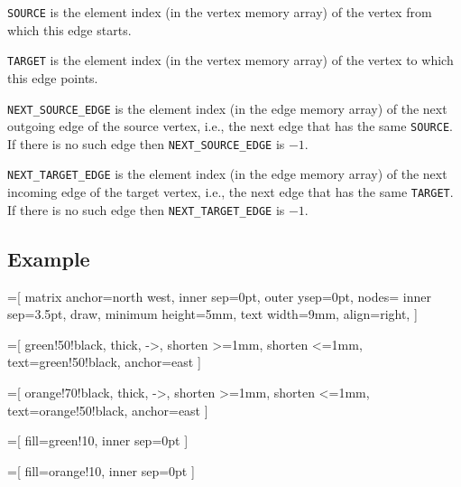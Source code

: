\documentclass[a4paper]{article}
\begin{document}
\texttt{SOURCE} is the element index (in the vertex memory array) of the vertex from which this edge starts.

\texttt{TARGET} is the element index (in the vertex memory array) of the vertex to which this edge points.

\texttt{NEXT\_SOURCE\_EDGE} is the element index (in the edge memory array) of the next outgoing edge of the source vertex,
	i.e., the next edge that has the same \texttt{SOURCE}.
If there is no such edge then \texttt{NEXT\_SOURCE\_EDGE} is $-1$.

\texttt{NEXT\_TARGET\_EDGE} is the element index (in the edge memory array) of the next incoming edge of the target vertex,
	i.e., the next edge that has the same \texttt{TARGET}.
If there is no such edge then \texttt{NEXT\_TARGET\_EDGE} is $-1$.





\subsection{Example}

=[
  	matrix anchor=north west,
		inner sep=0pt,
		outer ysep=0pt,
		nodes={
			inner sep=3.5pt,
			draw,
			minimum height=5mm,
			text width=9mm,
			align=right,
		}
	]

=[
		green!50!black,
		thick,
		->,
		shorten >=1mm,
		shorten <=1mm,
		text=green!50!black,
		anchor=east
	]

=[
		orange!70!black,
		thick,
		->,
		shorten >=1mm,
		shorten <=1mm,
		text=orange!50!black,
		anchor=east
	]

=[
		fill=green!10,
		inner sep=0pt
	]

=[
		fill=orange!10,
		inner sep=0pt
	]

\newcommand{\spot}[4]{
  \matrix (s) at (s.south west) [spot matrix]
  {
    \node (s#4c1) [text=red] {#1}; \\
    \node (s#4c2) [text=red] {#2}; \\
    \node (s#4c3) [minimum height=13.5mm] {}; \\
  };
	\node at (s#4c1.west) [text width=2mm, draw=none, xshift=2mm, text=black] {$#4$};
	\node at (s#4c1.west) [text width=3mm, draw=none, xshift=-1mm, text=blue, font=\scriptsize] {#3};
}
\end{document}
